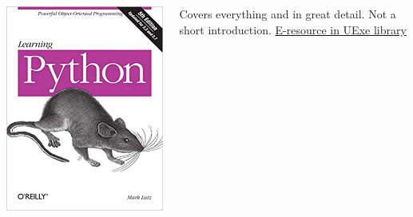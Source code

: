 \documentclass[xcolor=table,aspectratio=169]{beamer}
\begin{document}
{\begin{columns}
    \pause
    \begin{minipage}[c][0.6\textheight][c]{\linewidth}
        \centering
        \includegraphics[width=0.8\linewidth]{lutz_python.jpg}
    \end{minipage}
    \begin{minipage}[c][0.2\textheight][c]{\linewidth}
        \footnotesize{Covers everything and in great detail. Not a short introduction. \href{https://encore.exeter.ac.uk/iii/encore/record/C__Rb2506095}{E-resource in UExe library}} 
    \end{minipage}

\end{columns}
}
\end{document}
